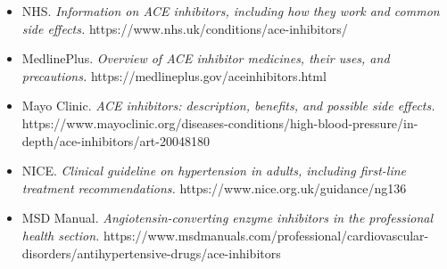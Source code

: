 \begin{itemize}
    \item NHS. \textit{Information on ACE inhibitors, including how they work and common side effects.} https://www.nhs.uk/conditions/ace-inhibitors/
    \item MedlinePlus. \textit{Overview of ACE inhibitor medicines, their uses, and precautions.} https://medlineplus.gov/aceinhibitors.html
    \item Mayo Clinic. \textit{ACE inhibitors: description, benefits, and possible side effects.} https://www.mayoclinic.org/diseases-conditions/high-blood-pressure/in-depth/ace-inhibitors/art-20048180
    \item NICE. \textit{Clinical guideline on hypertension in adults, including first-line treatment recommendations.} https://www.nice.org.uk/guidance/ng136
    \item MSD Manual. \textit{Angiotensin-converting enzyme inhibitors in the professional health section.} https://www.msdmanuals.com/professional/cardiovascular-disorders/antihypertensive-drugs/ace-inhibitors
\end{itemize}
